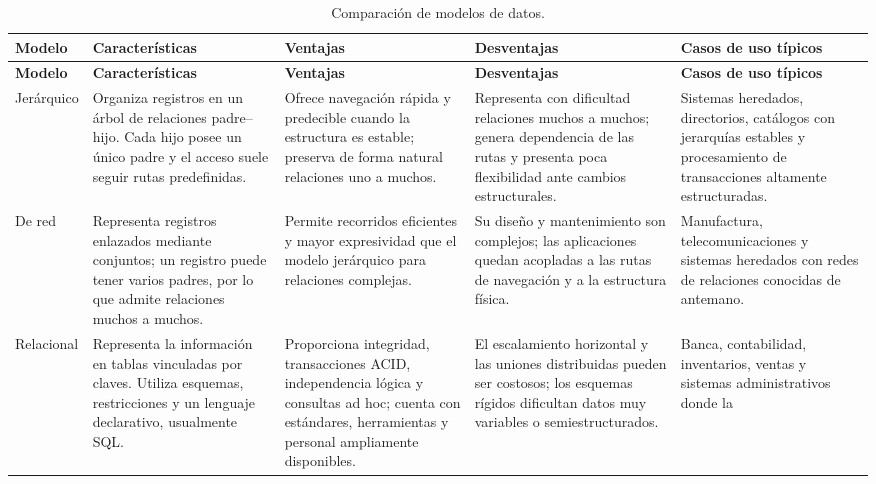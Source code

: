 \begin{landscape}
\begin{longtable}{>{\raggedright\arraybackslash}p{2.25cm}
                  >{\raggedright\arraybackslash}p{4.25cm}
                  >{\raggedright\arraybackslash}p{4.15cm}
                  >{\raggedright\arraybackslash}p{4.15cm}
                  >{\raggedright\arraybackslash}p{4.15cm}}
\caption{Comparación de modelos de datos.}\label{tab:modelos-datos}\\
\toprule
\rowcolor{unamblue}
\color{white}\textbf{Modelo} & \color{white}\textbf{Características} &
\color{white}\textbf{Ventajas} & \color{white}\textbf{Desventajas} &
\color{white}\textbf{Casos de uso típicos} \\
\midrule
\endfirsthead
\toprule
\rowcolor{unamblue}
\color{white}\textbf{Modelo} & \color{white}\textbf{Características} &
\color{white}\textbf{Ventajas} & \color{white}\textbf{Desventajas} &
\color{white}\textbf{Casos de uso típicos} \\
\midrule
\endhead
Jerárquico &
Organiza registros en un árbol de relaciones padre--hijo. Cada hijo posee un
único padre y el acceso suele seguir rutas predefinidas. &
Ofrece navegación rápida y predecible cuando la estructura es estable; preserva
de forma natural relaciones uno a muchos. &
Representa con dificultad relaciones muchos a muchos; genera dependencia de
las rutas y presenta poca flexibilidad ante cambios estructurales. &
Sistemas heredados, directorios, catálogos con jerarquías estables y
procesamiento de transacciones altamente estructuradas. \\
\rowcolor{softblue}
De red &
Representa registros enlazados mediante conjuntos; un registro puede tener
varios padres, por lo que admite relaciones muchos a muchos. &
Permite recorridos eficientes y mayor expresividad que el modelo jerárquico
para relaciones complejas. &
Su diseño y mantenimiento son complejos; las aplicaciones quedan acopladas a
las rutas de navegación y a la estructura física. &
Manufactura, telecomunicaciones y sistemas heredados con redes de relaciones
conocidas de antemano. \\
Relacional &
Representa la información en tablas vinculadas por claves. Utiliza esquemas,
restricciones y un lenguaje declarativo, usualmente SQL. &
Proporciona integridad, transacciones ACID, independencia lógica y consultas
ad hoc; cuenta con estándares, herramientas y personal ampliamente disponibles. &
El escalamiento horizontal y las uniones distribuidas pueden ser costosos;
los esquemas rígidos dificultan datos muy variables o semiestructurados. &
Banca, contabilidad, inventarios, ventas y sistemas administrativos donde la

\end{longtable}
\end{landscape}
